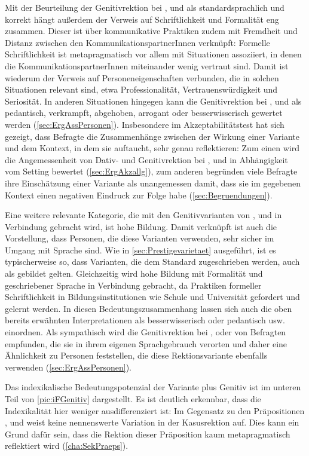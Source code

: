 Mit der Beurteilung der Genitivrektion bei \wegen, \waehrend{} und \dank{} als standardsprachlich und korrekt hängt außerdem der Verweis auf Schriftlichkeit und Formalität eng zusammen. 
Dieser ist über kommunikative Praktiken zudem mit Fremdheit und Distanz zwischen den KommunikationspartnerInnen verknüpft: 
Formelle Schriftlichkeit ist metapragmatisch vor allem mit Situationen assoziiert, in denen die KommunikationspartnerInnen miteinander wenig vertraut sind.  
Damit ist wiederum der Verweis auf Personeneigenschaften verbunden, die in solchen Situationen relevant sind, etwa Professionalität, Vertrauenswürdigkeit und Seriosität. 
In anderen Situationen hingegen kann die Genitivrektion bei \wegen, \waehrend{} und \dank{} als pedantisch, verkrampft, abgehoben, arrogant oder besserwisserisch gewertet werden (\autoref{sec:ErgAssPersonen}). 
Insbesondere im Akzeptabilitätstest hat sich gezeigt, dass Befragte die Zusammenhänge zwischen der Wirkung einer Variante und dem Kontext, in dem sie auftaucht, sehr genau reflektieren: 
Zum einen wird die Angemessenheit von Dativ- und Genitivrektion bei \wegen{}, \waehrend{} und \dank{} in Abhängigkeit vom Setting bewertet (\autoref{sec:ErgAkzallg}), zum anderen begründen viele Befragte ihre Einschätzung einer Variante als unangemessen damit, dass sie im gegebenen Kontext einen negativen Eindruck zur Folge habe (\autoref{sec:Begruendungen}). 

Eine weitere relevante Kategorie, die mit den Genitivvarianten von \wegen, \waehrend{} und \dank{} in Verbindung gebracht wird, ist hohe Bildung.
Damit verknüpft ist auch die Vorstellung, dass Personen, die diese Varianten verwenden, sehr sicher im Umgang mit Sprache sind. 
Wie in \autoref{sec:Prestigevarietaet} ausgeführt, ist es typischerweise so, dass Varianten, die dem Standard zugeschrieben werden, auch als gebildet gelten. 
Gleichzeitig wird hohe Bildung mit Formalität und geschriebener Sprache in Verbindung gebracht, da Praktiken formeller Schriftlichkeit in Bildungsinstitutionen wie Schule und Universität gefordert und gelernt werden. 
In diesen Bedeutungszusammenhang lassen sich auch die oben bereits erwähnten Interpretationen als besserwisserisch oder pedantisch usw. einordnen. 
Als sympathisch wird die Genitivrektion bei \wegen{}, \waehrend{} oder \dank{} von Befragten empfunden, die sie in ihrem eigenen Sprachgebrauch verorten und daher eine Ähnlichkeit zu Personen feststellen, die diese Rektionsvariante ebenfalls verwenden (\autoref{sec:ErgAssPersonen}). 

Das indexikalische Bedeutungspotenzial der Variante \gegenueber{} plus Genitiv ist im unteren Teil von \autoref{pic:iFGenitiv} dargestellt. 
Es ist deutlich erkennbar, dass die Indexikalität hier weniger ausdifferenziert ist: 
Im Gegensatz zu den Präpositionen \wegen, \waehrend{} und \dank{} weist \gegenueber{} keine nennenswerte Variation in der Kasusrektion auf.
Dies kann ein Grund dafür sein, dass die Rektion dieser Präposition kaum metapragmatisch reflektiert wird (\autoref{cha:SekPraeps}). 

